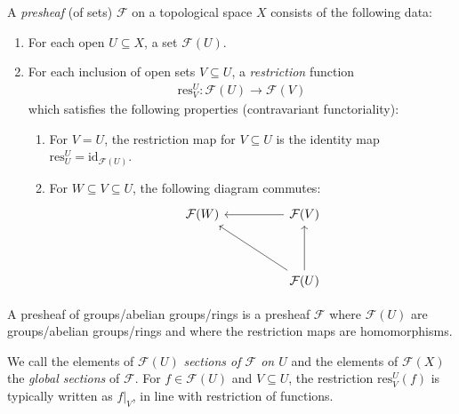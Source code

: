 \begin{definition}[Presheaf]
    A \emph{presheaf} (of sets) $\mathcal{F}$ on a topological space $X$ consists of the following data:
    \begin{enumerate}
        \item For each open $U \subseteq X$, a set $\mathcal{F}(U)$.
        \item For each inclusion of open sets $V \subseteq U$, a \emph{restriction} function 
            \begin{align*}
                \text{res}^U_V : \mathcal{F}(U) \to \mathcal{F}(V)
            \end{align*}
            which satisfies the following properties (contravariant functoriality):
            \begin{enumerate}
                \item For $V = U$, the restriction map for $V \subseteq U$ is the identity map $\text{res}_U^U = \text{id}_{\mathcal{F}(U)}$.
                \item For $W \subseteq V \subseteq U$, the following diagram commutes:
                    \[\begin{tikzcd}
                    	{\mathcal{F}(W)} && {\mathcal{F}(V)} \\
                    	\\
                    	&& {\mathcal{F}(U)}
                    	\arrow[from=1-3, to=1-1]
                    	\arrow[from=3-3, to=1-1]
                    	\arrow[from=3-3, to=1-3]
                    \end{tikzcd}\]
                
            \end{enumerate}
          \end{enumerate}
   A presheaf of groups/abelian groups/rings is a presheaf \(\mathcal{F}\) where \(\mathcal{F}(U)\) are groups/abelian groups/rings and where the restriction maps are homomorphisms.          
\end{definition}

We call the elements of \(\mathcal{F}(U)\) \emph{sections of \(\mathcal{F}\) on \(U\)} and the elements of \(\mathcal{F}(X)\) the \emph{global sections} of \(\mathcal{F}\).
For $f \in \mathcal{F}(U)$ and $V \subseteq U$, the restriction $\text{res}_V^U (f)$ is typically written  as $f|_V$, in line with restriction of functions.



